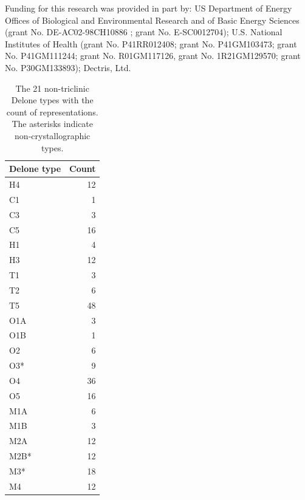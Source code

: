 \documentclass[preprint]{iucr}              %
\begin{document}
	Funding for this research was provided in part by: US Department of Energy Offices of Biological and Environmental Research and of Basic Energy Sciences (grant No. DE-AC02-98CH10886 ; grant No. E-SC0012704); U.S. National Institutes of Health (grant No. P41RR012408; grant No. P41GM103473; grant No. P41GM111244; grant No. R01GM117126, grant No. 1R21GM129570; grant No. P30GM133893); Dectris, Ltd.
	
	
	
	
	
	
	\begin{table}
		\caption{The 21 non-triclinic Delone types with the count of representations.
			The asterisks indicate non-crystallographic types.}
		\label{table:TypeCounts}
		\begin{tabular}{lr}
			Delone type & Count    \\
			\midrule
			H4&12\\
			C1&1\\
			C3&3\\
			C5&16\\
			H1&4\\
			H3&12\\
			T1&3\\
			T2&6\\
			T5&48\\
			O1A&3\\
			O1B&1\\
			O2&6\\
			O3*&9\\
			O4&36\\
			O5&16\\
			M1A&6\\
			M1B&3\\
			M2A&12\\
			M2B*&12\\
			M3*&18\\
			M4&12\\
			\bottomrule
		\end{tabular}
	\end{table}
	
\end{document}
